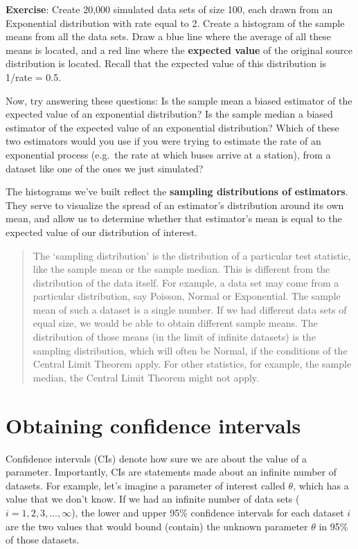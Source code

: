 \documentclass[
]{book}
\begin{document}
\textbf{Exercise}: Create 20,000 simulated data sets of size 100, each drawn from an Exponential distribution with rate equal to 2. Create a histogram of the sample means from all the data sets. Draw a blue line where the average of all these means is located, and a red line where the \textbf{expected value} of the original source distribution is located. Recall that the expected value of this distribution is 1/rate = 0.5.

Now, try answering these questions: Is the sample mean a biased estimator of the expected value of an exponential distribution? Is the sample median a biased estimator of the expected value of an exponential distribution? Which of these two estimators would you use if you were trying to estimate the rate of an exponential process (e.g.~the rate at which buses arrive at a station), from a dataset like one of the ones we just simulated?

The histograms we've built reflect the \textbf{sampling distributions of estimators}. They serve to visualize the spread of an estimator's distribution around its own mean, and allow us to determine whether that estimator's mean is equal to the expected value of our distribution of interest.

\begin{quote}
The `sampling distribution' is the distribution of a particular test statistic, like the sample mean or the sample median. This is different from the distribution of the data itself. For example, a data set may come from a particular distribution, say Poisson, Normal or Exponential. The sample mean of such a dataset is a single number. If we had different data sets of equal size, we would be able to obtain different sample means. The distribution of those means (in the limit of infinite datasets) is the sampling distribution, which will often be Normal, if the conditions of the Central Limit Theorem apply. For other statistics, for example, the sample median, the Central Limit Theorem might not apply.
\end{quote}

\hypertarget{obtaining-confidence-intervals}{%
\section{Obtaining confidence intervals}\label{obtaining-confidence-intervals}}

Confidence intervals (CIs) denote how sure we are about the value of a parameter. Importantly, CIs are statements made about an infinite number of datasets. For example, let's imagine a parameter of interest called \(\theta\), which has a value that we don't know. If we had an infinite number of data sets (\(i=1,2,3,...,\infty\)), the lower and upper 95\% confidence intervals for each dataset \(i\) are the two values that would bound (contain) the unknown parameter \(\theta\) in 95\% of those datasets.
\end{document}

